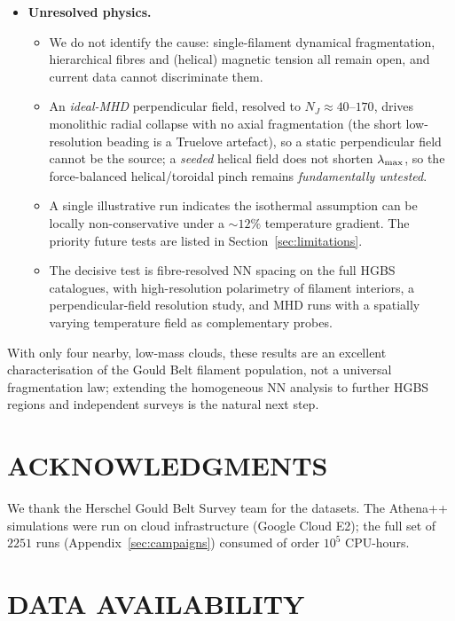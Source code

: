 \documentclass[usenatbib,twoside,twocolumn]{mnras}
\begin{document}
\begin{itemize}
    \item \textbf{Unresolved physics.}
    \begin{itemize}
        \item We do not identify the cause: single-filament dynamical fragmentation, hierarchical fibres and (helical) magnetic tension all remain open, and current data cannot discriminate them.
        \item An \emph{ideal-MHD} perpendicular field, resolved to $N_J\approx40$--$170$, drives monolithic radial collapse with no axial fragmentation (the short low-resolution beading is a Truelove artefact), so a static perpendicular field cannot be the source; a \emph{seeded} helical field does not shorten $\lambda_{\rm max}$, so the force-balanced helical/toroidal pinch remains \emph{fundamentally untested}.
        \item A single illustrative run indicates the isothermal assumption can be locally non-conservative under a $\sim12\%$ temperature gradient. The priority future tests are listed in Section~\ref{sec:limitations}.
        \item The decisive test is fibre-resolved NN spacing on the full HGBS catalogues, with high-resolution polarimetry of filament interiors, a perpendicular-field resolution study, and MHD runs with a spatially varying temperature field as complementary probes.
    \end{itemize}
    \end{itemize}

\smallskip\noindent With only four nearby, low-mass clouds, these results are an excellent characterisation of the Gould Belt filament population, not a universal fragmentation law; extending the homogeneous NN analysis to further HGBS regions and independent surveys is the natural next step.

\section*{ACKNOWLEDGMENTS}

We thank the Herschel Gould Belt Survey team for the datasets. The Athena++ simulations were run on cloud infrastructure (Google Cloud E2); the full set of $2251$ runs (Appendix~\ref{sec:campaigns}) consumed of order $10^5$ CPU-hours.

\section*{DATA AVAILABILITY}
\end{document}
